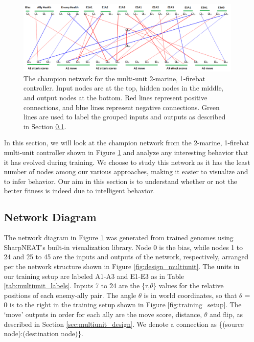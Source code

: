 \documentclass[10pt,a4paper,twocolumn]{article}
\begin{document}
\begin{figure}
\centering
\includegraphics[scale=.42]{figures/multiunit_labelled.png}
\caption{The champion network for the multi-unit 2-marine, 1-firebat controller. Input nodes are at the top, hidden nodes in the middle, and output nodes at the bottom. Red lines represent positive connections, and blue lines represent negative connections. Green lines are used to label the grouped inputs and outputs as described in Section \ref{sec:network_struct}.}
\label{fig:multiunit_mf_net}
\end{figure}

In this section, we will look at the champion network from the 2-marine, 1-firebat multi-unit controller shown in Figure \ref{fig:multiunit_mf_net} and analyze any interesting behavior that it has evolved during training. We choose to study this network as it has the least number of nodes among our various approaches, making it easier to visualize and to infer behavior. Our aim in this section is to understand whether or not the better fitness is indeed due to intelligent behavior.

\subsection{Network Diagram}
\label{sec:network_struct}

The network diagram in Figure \ref{fig:multiunit_mf_net} was generated from trained genomes using SharpNEAT's built-in visualization library. Node 0 is the bias, while nodes 1 to 24 and 25 to 45 are the inputs and outputs of the network, respectively, arranged per the network structure shown in Figure \ref{fig:design_multiunit}. The units in our training setup are labeled A1-A3 and E1-E3 as in Table \ref{tab:multiunit_labels}. Inputs 7 to 24 are the \{r,$\theta$\} values for the relative positions of each enemy-ally pair. The angle $\theta$ is in world coordinates, so that $\theta$ = 0 is to the right in the training setup shown in Figure \ref{fig:training_setup}. The `move' outputs in order for each ally are the move score, distance, $\theta$ and flip, as described in Section \ref{sec:multiunit_design}. We denote a connection as \{(source node):(destination node)\}.
\end{document}
